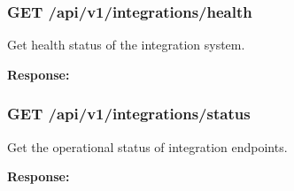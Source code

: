 \subsubsection{GET
/api/v1/integrations/health}\label{get-apiv1integrationshealth}

Get health status of the integration system.

\textbf{Response:}

\begin{Shaded}
\begin{Highlighting}[]
\FunctionTok{\{}
  \FunctionTok{:} \FunctionTok{,}
  \FunctionTok{:} \FunctionTok{,}
  \FunctionTok{:} \FunctionTok{\{\}}
\FunctionTok{\}}
\end{Highlighting}
\end{Shaded}

\subsubsection{GET
/api/v1/integrations/status}\label{get-apiv1integrationsstatus}

Get the operational status of integration endpoints.

\textbf{Response:}

\begin{Shaded}
\begin{Highlighting}[]
\FunctionTok{\{}
  \FunctionTok{:} \FunctionTok{,}
  \FunctionTok{:} \FunctionTok{,}
  \FunctionTok{:} \OtherTok{[}
    \FunctionTok{\{}
      \FunctionTok{:} \FunctionTok{,}
      \FunctionTok{:} 
    \FunctionTok{\}}\OtherTok{,}
    \FunctionTok{\{}
      \FunctionTok{:} \FunctionTok{,}
      \FunctionTok{:} 
    \FunctionTok{\}}\OtherTok{,}
    \FunctionTok{\{}
      \FunctionTok{:} \FunctionTok{,}
      \FunctionTok{:} 
    \FunctionTok{\}}
  \OtherTok{]}
\FunctionTok{\}}
\end{Highlighting}
\end{Shaded}

